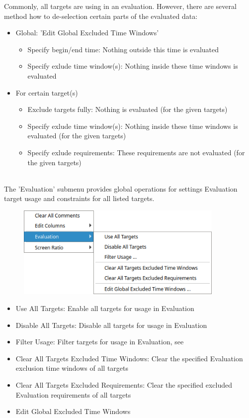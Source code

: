 Commonly, all targets are using in an evaluation. However, there are several method how to de-selection certain parts of the evaluated data:
\begin{itemize}
  \item Global: 'Edit Global Excluded Time Windows'
\begin{itemize}
  \item Specify begin/end time: Nothing outside this time is evaluated
  \item Specify exlude time window(s): Nothing inside these time windows is evaluated
 \end{itemize}   
  \item For certain target(s)
\begin{itemize}
  \item Exclude targets fully: Nothing is evaluated (for the given targets)
  \item Specify exlude time window(s): Nothing inside these time windows is evaluated (for the given targets)
  \item Specify exlude requirements: These requirements are not evaluated (for the given targets)
 \end{itemize}   
 \end{itemize} 
 \  \\

The 'Evaluation' submenu provides global operations for settings Evaluation target usage and constraints for all listed targets.

\begin{figure}[H]
  \center
  \includegraphics[width=10cm,frame]{figures/ui_targets_config_eval.png}
\end{figure}

\begin{itemize}
  \item Use All Targets: Enable all targets for usage in Evaluation
  \item Disable All Targets: Disable all targets for usage in Evaluation
  \item Filter Usage: Filter targets for usage in Evaluation, see 
  \item Clear All Targets Excluded Time Windows: Clear the specified Evaluation exclusion time windows of all targets
  \item Clear All Targets Excluded Requirements: Clear the specified excluded Evaluation requirements of all targets
  \item Edit Global Excluded Time Windows
\end{itemize} 
\ \\


